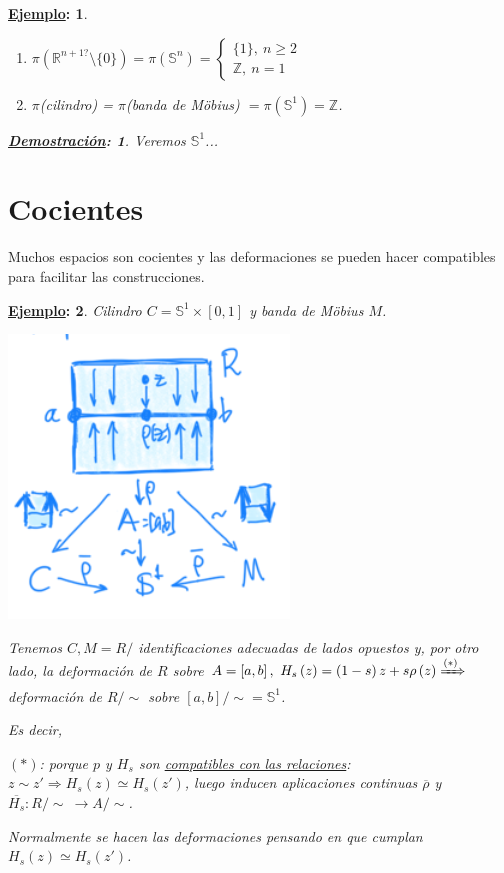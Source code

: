 \documentclass[10pt,a4paper,openright]{book}
\theoremstyle{break}
\newtheorem*{demo}{\underline{Demostración}:}
\newtheorem*{ej}{\underline{Ejemplo}:}
\begin{document}
\begin{ej}
\begin{enumerate}
    \item $\pi\left( \mathbb{R}^{n + 1?} \setminus \{0\} \right) = \pi\left( \mathbb{S}^n \right) = \begin{cases}
        \{1\},\ n\ge 2\\
        \mathbb{Z},\ n = 1
    \end{cases}$
    \item $\pi$(cilindro) = $\pi$(banda de Möbius) $= \pi \left( \mathbb{S}^1 \right) = \mathbb{Z}$.
\end{enumerate}
\begin{demo}
    Veremos $\mathbb{S}^1$...
\end{demo}
\end{ej}

\section{Cocientes}%
\label{sec:cocientes}
Muchos espacios son cocientes y las deformaciones se pueden hacer compatibles para facilitar las construcciones.

\begin{ej}
Cilindro $C = \mathbb{S}^1 \times \left[ 0, 1 \right]$ y banda de Möbius $M$.
\begin{center}
    \includegraphics[scale=0.3]{images/coc_cilindro_moebius} 
\end{center}
Tenemos $C, M = R / $ identificaciones adecuadas de lados opuestos y, por otro lado, la deformación de $R$ sobre $A = \left[ a, b \right],\ H_s\left( z \right) = \left( 1 - s \right) z + s \rho\left( z \right) \xRightarrow{(*)}$ deformación de $R / \sim$ sobre $\left[ a, b \right] / \sim = \mathbb{S}^1$. 

Es decir,  

$(*)$: porque $p$ y $H_s$ son \underline{compatibles con las relaciones}: $z \sim z' \Rightarrow H_s\left( z \right) \simeq H_s\left( z' \right)$, luego inducen aplicaciones continuas $\overline{\rho}$ y $\overline{H_s}: R / \sim\ \rightarrow A / \sim$. 

Normalmente se hacen las deformaciones pensando en que cumplan $H_s\left( z \right) \simeq H_s\left( z' \right)$.
\end{ej}
\end{document}
